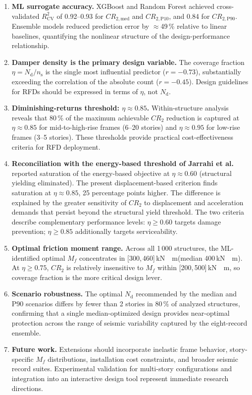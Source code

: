 \documentclass[preprint,12pt,authoryear]{elsarticle}
\newcommand{\CR}[1]{CR_{2,\text{#1}}}          %
\newcommand{\Rsq}{R^{2}_{\mathrm{CV}}}
\newcommand{\nd}{N_{\mathrm{d}}}               %
\newcommand{\np}{n_{\mathrm{s}}}               %
\newcommand{\etad}{\eta}                        %
\newcommand{\Mf}{M_{\!f}}                      %
\newcommand{\KM}{\,\si{kN{\cdot}m}}
\begin{document}
\begin{enumerate}

\item \textbf{ML surrogate accuracy.} XGBoost and Random Forest achieved
cross-validated $\Rsq$ of 0.92--0.93 for $\CR{med}$ and $\CR{P10}$, and 0.84
for $\CR{P90}$. Ensemble models reduced prediction error by $\approx$49\,\%
relative to linear baselines, quantifying the nonlinear structure of the
design-performance relationship.

\item \textbf{Damper density is the primary design variable.}
The coverage fraction $\etad = \nd/\np$ is the single most influential
predictor ($r = -0.73$), substantially exceeding the correlation of the
absolute count ($r = -0.45$). Design guidelines for RFDs should be expressed
in terms of $\etad$, not $\nd$.

\item \textbf{Diminishing-returns threshold: $\etad \approx 0.85$.}
Within-structure analysis reveals that 80\,\% of the maximum achievable $CR_2$
reduction is captured at $\etad \approx 0.85$ for mid-to-high-rise frames
(6--20 stories) and $\etad \approx 0.95$ for low-rise frames (3--5 stories).
These thresholds provide practical cost-effectiveness criteria for RFD deployment.

\item \textbf{Reconciliation with the energy-based threshold of Jarrahi et al.}
\citet{Jarrahi2020sdee} reported saturation of the energy-based objective at
$\etad \approx 0.60$ (structural yielding eliminated). The present
displacement-based criterion finds saturation at $\etad \approx 0.85$, 25
percentage points higher. The difference is explained by the greater sensitivity
of $CR_2$ to displacement and acceleration demands that persist beyond the
structural yield threshold. The two criteria describe complementary performance
levels: $\etad \geq 0.60$ targets damage prevention; $\etad \geq 0.85$
additionally targets serviceability.

\item \textbf{Optimal friction moment range.} Across all 1\,000 structures,
the ML-identified optimal $\Mf$ concentrates in [300,\,460]\KM (median
400\KM). At $\etad \geq 0.75$, $CR_2$ is relatively insensitive to $\Mf$
within [200,\,500]\KM, so coverage fraction is the more critical design lever.

\item \textbf{Scenario robustness.} The optimal $\nd$ recommended by the
median and P90 scenarios differs by fewer than 2 stories in 80\,\% of analyzed
structures, confirming that a single median-optimized design provides near-optimal
protection across the range of seismic variability captured by the eight-record
ensemble.

\item \textbf{Future work.} Extensions should incorporate inelastic frame
behavior, story-specific $\Mf$ distributions, installation cost constraints, and
broader seismic record suites. Experimental validation for multi-story
configurations and integration into an interactive design tool represent immediate
research directions.

\end{enumerate}


\end{document}
